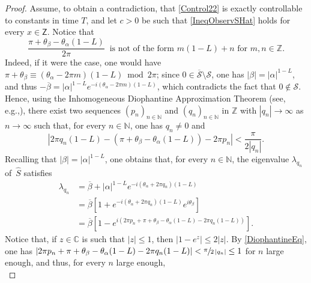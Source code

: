 \documentclass[10pt]{amsart}
\providecommand{\eg}{}
\renewcommand{\eg}{e.g.,\xspace}
\theoremstyle{plain}
\theoremstyle{definition}
\newcommand{\abs}[1]{\left\lvert #1\right \rvert}
\begin{document}
\begin{proof}
Assume, to obtain a contradiction, that \eqref{Control22} is exactly controllable to constants in time $T$, and let $c > 0$ be such that \eqref{IneqObservSHat} holds for every $x \in \mathsf Z$. Notice that
\begin{equation}\label{eq:mn}
\frac{\pi + \theta_\beta - \theta_\alpha(1 - L)}{2 \pi}\ \text{ is not of the form } m (1 - L) + n \text{ for } m, n \in \mathbb Z.
\end{equation}
Indeed, if it were the case, one would have $\pi + \theta_\beta \equiv (\theta_\alpha - 2 \pi m) (1 - L) \bmod 2 \pi$; since $0 \in \overline{\mathcal S} \setminus \mathcal S$, one has $\abs{\beta} = \abs{\alpha}^{1 - L}$, and thus $-\overline\beta = \abs{\alpha}^{1 - L} e^{- i (\theta_\alpha - 2 \pi m) (1 - L)}$, which contradicts the fact that $0 \notin \mathcal S$. Hence, using the Inhomogeneous Diophantine Approximation Theorem (see, \eg \cite[Chap.\,III, Th.\,II\,A]{Cassels1957Introduction}), there exist two sequences $(p_n)_{n \in \mathbb N}$ and $(q_n)_{n \in \mathbb N}$ in $\mathbb Z$ with $\abs{q_n} \to \infty$ as $n \to \infty$ such that, for every $n \in \mathbb N$, one has $q_n \neq 0$ and
\begin{equation}
\label{DiophantineEq}
\abs{2 \pi q_n (1 - L) - (\pi + \theta_\beta - \theta_\alpha (1 - L)) - 2 \pi p_n} < \frac{\pi}{2 \abs{q_n}}.
\end{equation}
Recalling that $\abs{\beta} = \abs{\alpha}^{1 - L}$, one obtains that, for every $n \in \mathbb N$, the eigenvalue $\lambda_{q_n}$ of~$\widehat S$ satisfies
\begin{equation}
\label{LambdaN}
\begin{aligned}
\lambda_{q_n} & = \overline\beta + \abs{\alpha}^{1 - L} e^{- i (\theta_\alpha + 2 \pi q_n)(1 - L)} \\
& = \overline\beta\left[1 + e^{-i(\theta_\alpha + 2 \pi q_n)(1 - L)} e^{i \theta_\beta}\right] \\
& = \overline\beta\left[1 - e^{i (2 \pi p_n + \pi + \theta_\beta - \theta_\alpha(1 - L) - 2 \pi q_n (1 - L))}\right].
\end{aligned}
\end{equation}
Notice that, if $z \in \mathbb C$ is such that $\abs{z} \leq 1$, then $\abs{1 - e^z} \leq 2 \abs{z}$. By \eqref{DiophantineEq}, one has $\lvert 2 \pi p_n + \pi + \theta_\beta - \theta_\alpha(1 - L) - 2 \pi q_n (1 - L) \rvert < \sfrac{\pi}{2 \abs{q_n}} \leq 1$ for $n$ large enough, and thus, for every $n$ large enough,
\begin{equation}
\label{EstimLambdaN}

\end{equation}
\end{proof}
\end{document}
